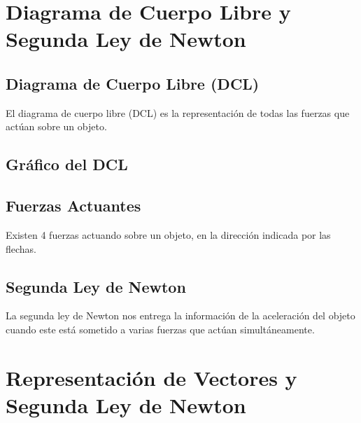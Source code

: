 \section{Diagrama de Cuerpo Libre y Segunda Ley de Newton}

\subsection*{Diagrama de Cuerpo Libre (DCL)}
El diagrama de cuerpo libre (DCL) es la representación de todas las fuerzas que actúan sobre un objeto.

\subsection*{Gráfico del DCL}

\begin{center}
\end{center}

\subsection*{Fuerzas Actuantes}
Existen 4 fuerzas actuando sobre un objeto, en la dirección indicada por las flechas.

\subsection*{Segunda Ley de Newton}
La segunda ley de Newton nos entrega la información de la aceleración del objeto cuando este está sometido a varias fuerzas que actúan simultáneamente.


\section{Representación de Vectores y Segunda Ley de Newton}

